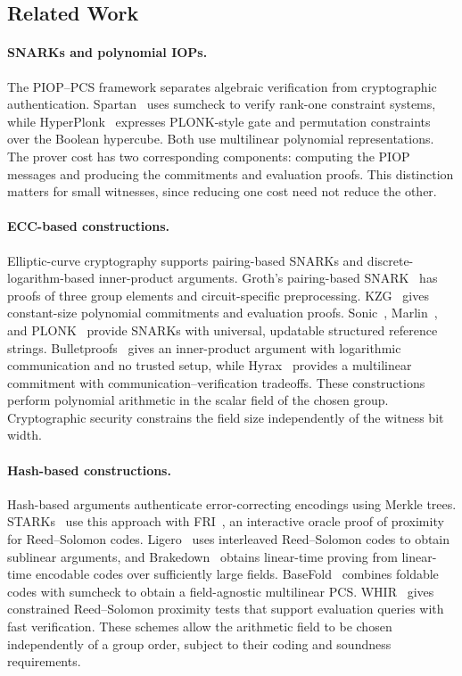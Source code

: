 \subsection{Related Work}
\label{sec:related-work}

\paragraph{SNARKs and polynomial IOPs.}
The PIOP--PCS framework separates algebraic verification from
cryptographic authentication.
Spartan~\cite{crypto/Setty20} uses sumcheck to verify rank-one
constraint systems, while HyperPlonk~\cite{eurocrypt/ChenBBZ23}
expresses PLONK-style gate and permutation constraints over the
Boolean hypercube. Both use multilinear polynomial representations.
The prover cost has two corresponding components: computing the
PIOP messages and producing the commitments and evaluation proofs.
This distinction matters for small witnesses, since reducing one
cost need not reduce the other.

\paragraph{ECC-based constructions.}
Elliptic-curve cryptography supports pairing-based SNARKs and
discrete-logarithm-based inner-product arguments.
Groth's pairing-based SNARK~\cite{eurocrypt/Groth16} has proofs
of three group elements and circuit-specific preprocessing.
KZG~\cite{asiacrypt/KateZG10} gives constant-size polynomial
commitments and evaluation proofs.
Sonic~\cite{ccs/MallerBKM19}, Marlin~\cite{eurocrypt/ChiesaHMMVW20},
and PLONK~\cite{iacr/GabizonWC19} provide SNARKs with universal,
updatable structured reference strings.
Bulletproofs~\cite{sp/BunzBBPWM18} gives an inner-product argument
with logarithmic communication and no trusted setup, while
Hyrax~\cite{sp/WahbyTSTW18} provides a multilinear commitment with
communication--verification tradeoffs.
These constructions perform polynomial arithmetic in the scalar
field of the chosen group. Cryptographic security constrains the
field size independently of the witness bit width.

\paragraph{Hash-based constructions.}
Hash-based arguments authenticate error-correcting encodings using
Merkle trees. STARKs~\cite{iacr/Ben-SassonBHR18} use this approach
with FRI~\cite{icalp/Ben-SassonBHR18}, an interactive oracle proof
of proximity for Reed--Solomon codes.
Ligero~\cite{dcc/AmesHIV23} uses interleaved Reed--Solomon codes
to obtain sublinear arguments, and
Brakedown~\cite{crypto/GolovnevLSTW23} obtains linear-time proving
from linear-time encodable codes over sufficiently large fields.
BaseFold~\cite{crypto/ZeilbergerCF24} combines foldable codes with
sumcheck to obtain a field-agnostic multilinear PCS.
WHIR~\cite{eurocrypt/ArnonCFY25} gives constrained Reed--Solomon
proximity tests that support evaluation queries with fast verification.
These schemes allow the arithmetic field to be chosen independently
of a group order, subject to their coding and soundness requirements.

